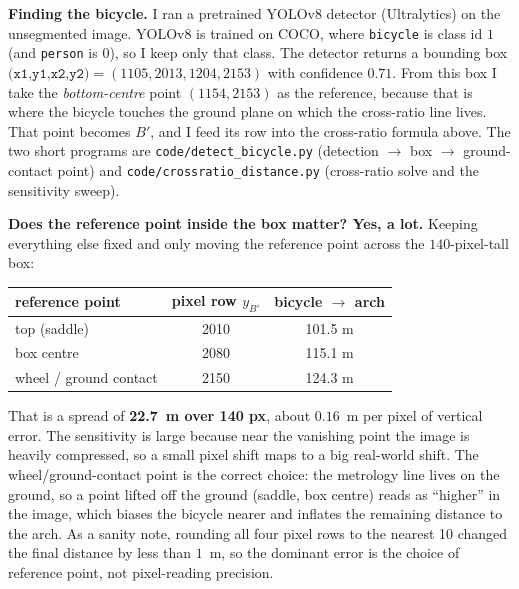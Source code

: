 \begin{studentSpace}
\noindent\textbf{Finding the bicycle.} I ran a pretrained YOLOv8 detector
(Ultralytics) on the unsegmented image. YOLOv8 is trained on COCO, where
\texttt{bicycle} is class id $1$ (and \texttt{person} is $0$), so I keep
only that class. The detector returns a bounding box
$\texttt{(x1,y1,x2,y2)}=(1105,2013,1204,2153)$ with confidence $0.71$.
From this box I take the \emph{bottom-centre} point $(1154,2153)$ as the
reference, because that is where the bicycle touches the ground plane on
which the cross-ratio line lives. That point becomes $B'$, and I feed its
row into the cross-ratio formula above. The two short programs are
\texttt{code/detect\_bicycle.py} (detection $\rightarrow$ box
$\rightarrow$ ground-contact point) and
\texttt{code/crossratio\_distance.py} (cross-ratio solve and the
sensitivity sweep).

\noindent\textbf{Does the reference point inside the box matter? Yes,
a lot.} Keeping everything else fixed and only moving the reference point
across the $140$-pixel-tall box:

\begin{center}
\begin{tabular}{lcc}
\hline
reference point & pixel row $y_{B'}$ & bicycle $\rightarrow$ arch \\
\hline
top (saddle)          & 2010 & 101.5 m \\
box centre            & 2080 & 115.1 m \\
wheel / ground contact& 2150 & 124.3 m \\
\hline
\end{tabular}
\end{center}

That is a spread of \textbf{22.7~m over 140 px}, about $0.16$~m per pixel
of vertical error. The sensitivity is large because near the vanishing
point the image is heavily compressed, so a small pixel shift maps to a
big real-world shift. The wheel/ground-contact point is the correct
choice: the metrology line lives on the ground, so a point lifted off the
ground (saddle, box centre) reads as ``higher'' in the image, which
biases the bicycle nearer and inflates the remaining distance to the
arch. As a sanity note, rounding all four pixel rows to the nearest 10
changed the final distance by less than $1$~m, so the dominant error is
the choice of reference point, not pixel-reading precision.
\end{studentSpace}


